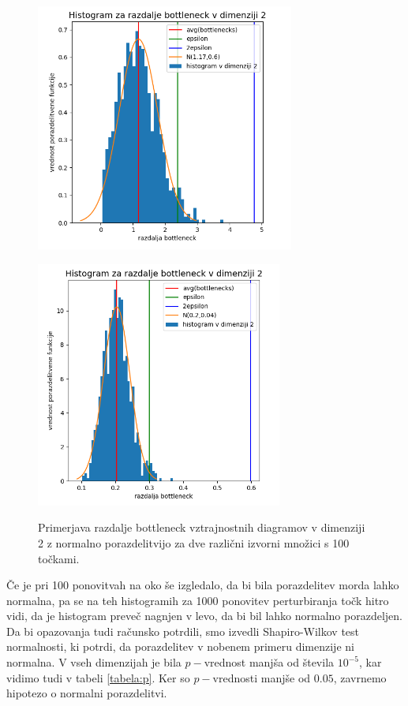 \documentclass[a4paper,11pt]{article}
\theoremstyle{definition}
\theoremstyle{plain}
\begin{document}
\begin{figure}[ht!]
    \begin{minipage}{0.5\textwidth}
        \centering
        \includegraphics[width=85mm]{../slike/bottleneck_1000_dim2.png}
        \label{slika:hist1_2}
    \end{minipage}\hfill
    \begin{minipage}{0.5\textwidth}
        \centering
        \includegraphics[width=81mm]{../slike/bottleneck2_1000_dim2.png}
        \label{slika:hist2_2}
    \end{minipage}\hfill
    \caption{Primerjava razdalje bottleneck vztrajnostnih diagramov v dimenziji 2 z normalno porazdelitvijo za dve različni izvorni množici s 100 točkami.}
\end{figure}

\newpage
Če je pri 100 ponovitvah na oko še izgledalo, da bi bila porazdelitev morda lahko normalna, pa se na teh histogramih za 1000 ponovitev perturbiranja točk hitro vidi, da je histogram preveč nagnjen v levo, da bi bil lahko normalno porazdeljen.
Da bi opazovanja tudi računsko potrdili, smo izvedli Shapiro-Wilkov test normalnosti, ki potrdi, da porazdelitev v nobenem primeru dimenzije ni normalna. 
V vseh dimenzijah je bila $p-$vrednost manjša od števila $10^{-5}$, kar vidimo tudi v tabeli \ref{tabela:p}. Ker so $p-$vrednosti manjše od $0.05$, zavrnemo hipotezo o normalni porazdelitvi.
\end{document}

